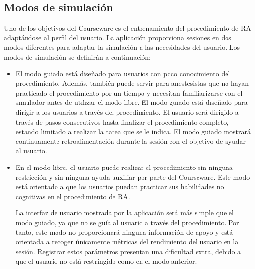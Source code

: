 


\subsection{Modos de simulación}
\label{course:modos}
Uno de los objetivos del \ac{Courseware} es el entrenamiento del procedimiento de \ac{RA} adaptándose al perfil del usuario. La aplicación proporciona sesiones en dos modos diferentes para adaptar la simulación a las necesidades del usuario. Los modos de simulación se definirán a continuación:

\begin{itemize}
    \item El modo guiado está diseñado para usuarios con poco conocimiento del procedimiento. Además, también puede servir para anestesistas que no hayan practicado el procedimiento por un tiempo y necesitan familiarizarse con el simulador antes de utilizar el modo libre. %
El modo guiado está diseñado para dirigir a los usuarios a través del procedimiento. El usuario será dirigido a través de pasos consecutivos hasta finalizar el procedimiento completo, estando limitado a realizar la tarea que se le indica. El modo guiado mostrará continuamente retroalimentación durante la sesión con el objetivo de ayudar al usuario.%

\item En el modo libre, el usuario puede realizar el procedimiento sin ninguna restricción y sin ninguna ayuda auxiliar por parte del \ac{Courseware}. Este modo está orientado a que los usuarios puedan practicar sus habilidades no cognitivas en el procedimiento de \ac{RA}. 

La interfaz de usuario mostrada por la aplicación será más simple que el modo guiado, ya que no se guía al usuario a través del procedimiento. Por tanto, este modo no proporcionará ninguna información de apoyo y está orientada a recoger únicamente métricas del rendimiento del usuario en la sesión. Registrar estos parámetros presentan una dificultad extra, debido a que el usuario no está restringido como en el modo anterior. %

\end{itemize}

